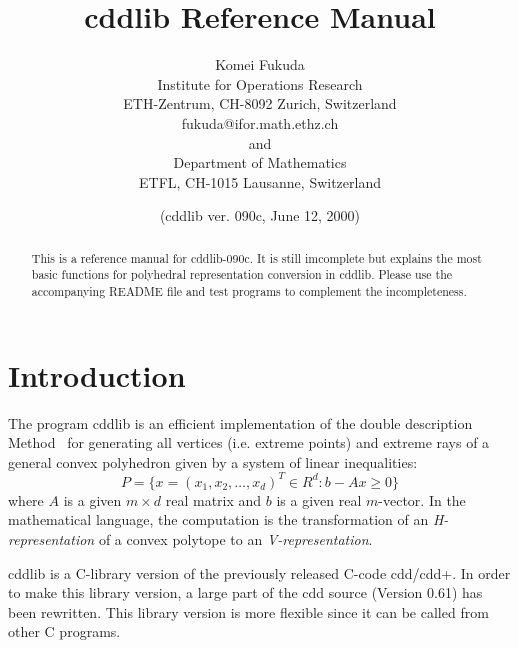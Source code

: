 \documentclass[11pt]{article}
\newcommand {\0} {{\bf 0}}
\begin{document}
\title{cddlib Reference Manual}
\author{Komei Fukuda \\
Institute for Operations Research\\
ETH-Zentrum, CH-8092 Zurich, Switzerland\\
fukuda@ifor.math.ethz.ch \\and\\
Department of Mathematics\\
ETFL, CH-1015 Lausanne, Switzerland}
\date{ (cddlib ver. 090c,  June 12, 2000)}

\maketitle
\begin{abstract}
This is a reference manual for cddlib-090c.  
It is still imcomplete but explains the most basic functions for polyhedral
representation conversion in cddlib.  
Please use the accompanying README file and test programs to complement the incompleteness.
\end{abstract}

\section{Introduction} \label{INTRODUCTION}

The program  cddlib  is an efficient implementation \cite{fp-ddmr-96}  of 
the double description Method~\cite{mrtt-ddm-53}
for generating  all vertices (i.e. extreme points)
and extreme rays of a general 
convex polyhedron given by 
a system of linear inequalities:
\[
   P = \{ x=(x_1, x_2, \ldots, x_d)^T \in R^{d}:  b - A  x  \ge 0 \}
\]
where $A$ is a given $m \times d$ real matrix and 
$b$ is a given real $m$-vector.   In the mathematical
language, the computation is the transformation
of an {\em H-representation\/} of a convex polytope
to an {\em V-representation}.  

cddlib is a C-library version of the previously released C-code cdd/cdd+.
In order to make this library version, a large part of the cdd source
(Version 0.61) has been rewritten.
This library version is more flexible since it can be called from other
C programs.
\end{document}
